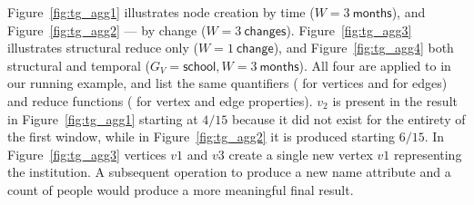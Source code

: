 Figure~\ref{fig:tg_agg1} illustrates node creation by time
($W=3~\textsf{months}$), and Figure~\ref{fig:tg_agg2} --- by change
($W=3~\textsf{changes}$).  Figure~\ref{fig:tg_agg3} illustrates
structural reduce only ($W=1~\textsf{change}$), and
Figure~\ref{fig:tg_agg4} both structural and temporal
($G_V=\textsf{school}, W=3~\textsf{months}$).  All four are applied to
 in our running example, and list the same quantifiers
( for vertices and  for edges) and reduce
functions ( for vertex and edge properties).  $v_2$ is
present in the result in Figure~\ref{fig:tg_agg1} starting at $4/15$
because it did not exist for the entirety of the first window, while
in Figure~\ref{fig:tg_agg2} it is produced starting $6/15$.  In
Figure~\ref{fig:tg_agg3} vertices $v1$ and $v3$ create a single new
vertex $v1$ representing the institution.  A subsequent 
operation to produce a new name attribute and a count of people would
produce a more meaningful final result.

